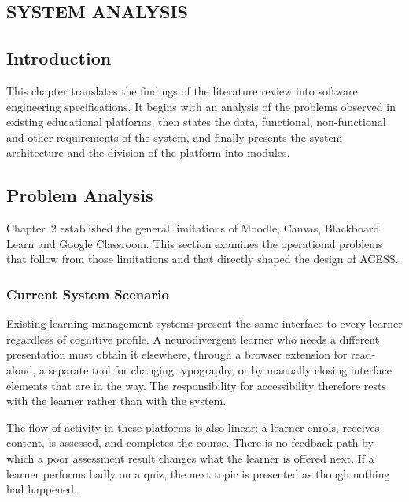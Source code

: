 \documentclass[12pt, oneside]{article} %
\begin{document}

\newpage
\vfill \null
\thispagestyle{empty}
\begin{center}
\section{SYSTEM ANALYSIS}
\end{center}
\vspace{2cm}

\subsection{Introduction}

This chapter translates the findings of the literature review into software engineering specifications. It begins with an analysis of the problems observed in existing educational platforms, then states the data, functional, non-functional and other requirements of the system, and finally presents the system architecture and the division of the platform into modules.

\subsection{Problem Analysis}

Chapter~2 established the general limitations of Moodle, Canvas, Blackboard Learn and Google Classroom. This section examines the operational problems that follow from those limitations and that directly shaped the design of ACESS.

\subsubsection{Current System Scenario}

Existing learning management systems present the same interface to every learner regardless of cognitive profile. A neurodivergent learner who needs a different presentation must obtain it elsewhere, through a browser extension for read-aloud, a separate tool for changing typography, or by manually closing interface elements that are in the way. The responsibility for accessibility therefore rests with the learner rather than with the system.

The flow of activity in these platforms is also linear: a learner enrols, receives content, is assessed, and completes the course. There is no feedback path by which a poor assessment result changes what the learner is offered next. If a learner performs badly on a quiz, the next topic is presented as though nothing had happened.
\end{document}
